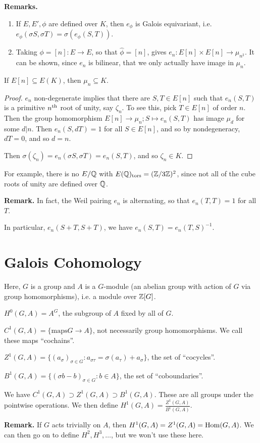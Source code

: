 \documentclass[10pt,a4paper]{article}
\begin{document}
\textbf{Remarks.}
\begin{enumerate}
  \item If $E,E', \phi$ are defined over $K$, then $e_\phi$ is Galois equivariant, i.e. $e_\phi(\sigma S, \sigma T) = \sigma(e_\phi(S,T))$.
  \item Taking $\phi = [n]:E \to E$, so that $\hat{\phi} = [n]$, gives $e_n:E[n]\times E[n] \to \mu_{n^2}$. It can be shown, since $e_n$ is bilinear, that we only actually have image in $\mu_n$.
\end{enumerate}
\begin{corollary}
  If $E[n]\subseteq E(K)$, then $\mu_n \subseteq K$.
\end{corollary}
\begin{proof}
  $e_n$ non-degenerate implies that there are $S,T \in E[n]$ such that $e_n(S,T)$ is a primitive $n\textsuperscript{th}$ root of unity, say $\zeta_n$. To see this, pick $T \in E[n]$ of order $n$. Then the group homomorphism $E[n] \to \mu_n; S \mapsto e_n(S,T)$ has image $\mu_d$ for some $d |n$. Then $e_n(S,dT) = 1$ for all $S \in E[n]$, and so by nondegeneracy, $dT = 0$, and so $d=n$.

  Then $\sigma(\zeta_n) = e_n(\sigma S, \sigma T)= e_n(S,T)$, and so $\zeta_n \in K$.
\end{proof}
For example, there is no $E/\mathbb{Q}$ with $E(\mathbb{Q})_\text{tors} = (\mathbb{Z}/3\mathbb{Z})^2$, since not all of the cube roots of unity are defined over $\mathbb{Q}$.

\textbf{Remark.} In fact, the Weil pairing $e_n$ is alternating, so that $e_n(T,T) = 1$ for all $T$.

In particular, $e_n(S+T,S+T)$, we have $e_n(S,T) = e_n(T,S)^{-1}$.

\section{Galois Cohomology}
Here, $G$ is a group and $A$ is a $G$-module (an abelian group with action of $G$ via group homomorphisms), i.e. a module over $\mathbb{Z}[G]$.
\begin{definition}
  $H^0(G,A) = A^G$, the subgroup of $A$ fixed by all of $G$.

  $C^1(G,A) = \{\text{maps} G \to A\}$, not necessarily group homomorphisms. We call these maps ``cochains''.

  $Z^1(G,A) = \{(a_\sigma)_{\sigma \in G} : a_{\sigma \tau} = \sigma(a_\tau) + a_\sigma\}$, the set of ``cocycles''.

  $B^1(G,A) = \{(\sigma b- b)_{\sigma \in G} : b \in A\}$, the set of ``coboundaries''.

  We have $C^1(G,A) \supset Z^1(G,A) \supset B^1(G,A)$. These are all groups under the pointwise operations. We then define $H^1(G,A) = \frac{Z^1(G,A)}{B^1(G,A)}$.
\end{definition}
\textbf{Remark.} If $G$ acts trivially on $A$, then $H^1(G,A) = Z^1(G,A) = \operatorname{Hom}(G,A)$. We can then go on to define $H^2, H^3, \ldots$, but we won't use these here.
\end{document}
